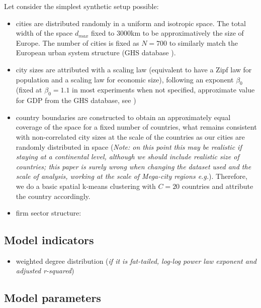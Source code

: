 \documentclass{article}
\begin{document}
Let consider the simplest synthetic setup possible:
\begin{itemize}
    \item cities are distributed randomly in a uniform and isotropic space. The total width of the space $d_{max}$ fixed to 3000km to be approximatively the size of Europe. The number of cities is fixed as $N=700$ to similarly match the European urban system structure (GHS database \citep{Florczyk2019ghs}).
    \item city sizes are attributed with a scaling law (equivalent to have a Zipf law for population and a scaling law for economic size), following an exponent $\beta_0$ (fixed at $\beta_0 = 1.1$ in most experiments when not specified, approximate value for GDP from the GHS database, see \citep{raimbault:halshs-02284897})
    \item country boundaries are constructed to obtain an approximately equal coverage of the space for a fixed number of countries, what remains consistent with non-correlated city sizes at the scale of the countries as our cities are randomly distributed in space \citep{simini2019testing} (\textit{Note: on this point this may be realistic if staying at a continental level, although we should include realistic size of countries; this paper is surely wrong when changing the dataset used and the scale of analysis, working at the scale of Mega-city regions e.g.}). Therefore, we do a basic spatial k-means clustering with $C = 20$ countries and attribute the country accordingly.
    \item firm sector structure: 
\end{itemize}


\subsection{Model indicators}

\begin{itemize}
    \item weighted degree distribution (\textit{if it is fat-tailed, log-log power law exponent and adjusted r-squared})
\end{itemize}


\subsection{Model parameters}
\end{document}
